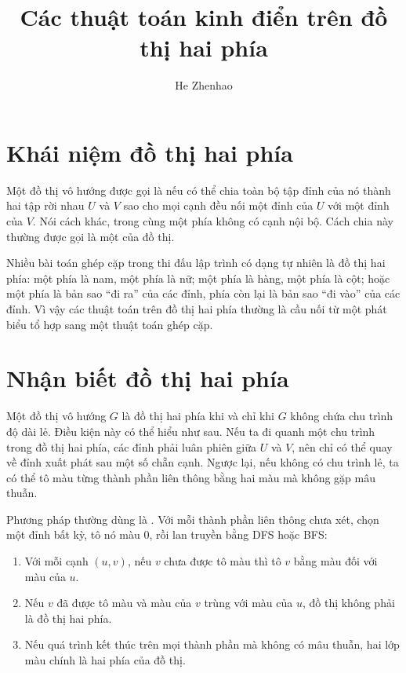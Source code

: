 \documentclass[11pt]{article}
\title{Các thuật toán kinh điển trên đồ thị hai phía}
\author{He Zhenhao}
\date{}
\begin{document}
\maketitle


\section{Khái niệm đồ thị hai phía}

Một đồ thị vô hướng được gọi là  nếu có thể chia toàn bộ
tập đỉnh của nó thành hai tập rời nhau $U$ và $V$ sao cho mọi cạnh đều nối một
đỉnh của $U$ với một đỉnh của $V$. Nói cách khác, trong cùng một phía không có
cạnh nội bộ. Cách chia này thường được gọi là một 
của đồ thị.

Nhiều bài toán ghép cặp trong thi đấu lập trình có dạng tự nhiên là đồ thị hai
phía: một phía là nam, một phía là nữ; một phía là hàng, một phía là cột; hoặc
một phía là bản sao ``đi ra'' của các đỉnh, phía còn lại là bản sao ``đi vào''
của các đỉnh. Vì vậy các thuật toán trên đồ thị hai phía thường là cầu nối từ
một phát biểu tổ hợp sang một thuật toán ghép cặp.

\section{Nhận biết đồ thị hai phía}

Một đồ thị vô hướng $G$ là đồ thị hai phía khi và chỉ khi $G$ không chứa chu
trình độ dài lẻ. Điều kiện này có thể hiểu như sau. Nếu ta đi quanh một chu
trình trong đồ thị hai phía, các đỉnh phải luân phiên giữa $U$ và $V$, nên chỉ
có thể quay về đỉnh xuất phát sau một số chẵn cạnh. Ngược lại, nếu không có
chu trình lẻ, ta có thể tô màu từng thành phần liên thông bằng hai màu mà không
gặp mâu thuẫn.

Phương pháp thường dùng là . Với mỗi thành phần liên thông
chưa xét, chọn một đỉnh bất kỳ, tô nó màu $0$, rồi lan truyền bằng DFS hoặc
BFS:
\begin{enumerate}
  \item Với mỗi cạnh $(u,v)$, nếu $v$ chưa được tô màu thì tô $v$ bằng màu đối
  với màu của $u$.
  \item Nếu $v$ đã được tô màu và màu của $v$ trùng với màu của $u$, đồ thị
  không phải là đồ thị hai phía.
  \item Nếu quá trình kết thúc trên mọi thành phần mà không có mâu thuẫn, hai
  lớp màu chính là hai phía của đồ thị.
\end{enumerate}
\end{document}
